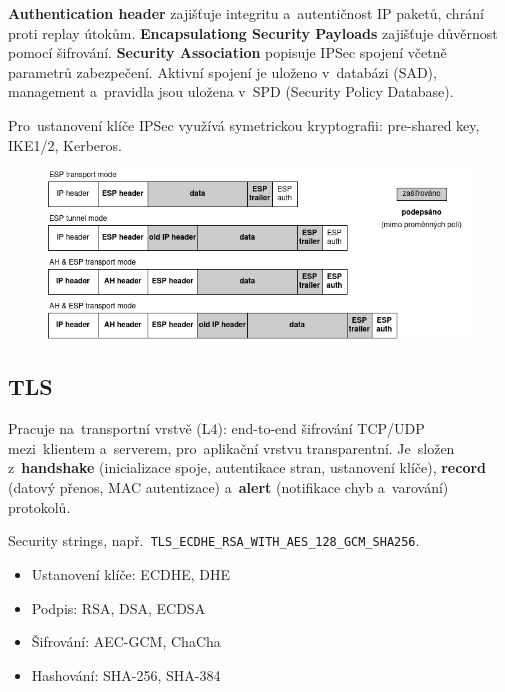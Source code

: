 \textbf{Authentication header} zajišťuje integritu a~autentičnost IP paketů, chrání proti replay útokům. \textbf{Encapsulationg Security Payloads} zajišťuje důvěrnost pomocí šifrování. \textbf{Security Association} popisuje IPSec spojení včetně parametrů zabezpečení. Aktivní spojení je uloženo v~databázi (SAD), management a~pravidla jsou uložena v~SPD (Security Policy Database).

Pro~ustanovení klíče IPSec využívá symetrickou kryptografii: pre-shared key, IKE1/2, Kerberos.

\begin{figure}[ht]
\centering
\includegraphics[width=\textwidth]{images/ipsec-modes}
\end{figure}

\clearpage
\subsection{TLS}

Pracuje na~transportní vrstvě (L4): end-to-end šifrování TCP/UDP mezi~klientem a~serverem, pro~aplikační vrstvu transparentní. Je~složen z~\textbf{handshake} (inicializace spoje, autentikace stran, ustanovení klíče), \textbf{record} (datový přenos, MAC autentizace) a~\textbf{alert} (notifikace chyb a~varování) protokolů.

Security strings, např.~\texttt{TLS\_ECDHE\_RSA\_WITH\_AES\_128\_GCM\_SHA256}.

\begin{itemize}[noitemsep]
\item Ustanovení klíče: ECDHE, DHE
\item Podpis: RSA, DSA, ECDSA
\item Šifrování: AEC-GCM, ChaCha
\item Hashování: SHA-256, SHA-384
\end{itemize}

